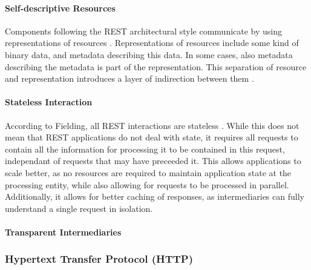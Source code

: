 \paragraph{Self-descriptive Resources}

Components following the \ac{REST} architectural style communicate by using representations of resources \cite{Fielding2000}.
Representations of resources include some kind of binary data, and metadata describing this data.
In some cases, also metadata describing the metadata is part of the representation.
This separation of resource and representation introduces a layer of indirection between them \cite{Erenkrantz2007}.

\paragraph{Stateless Interaction}

According to Fielding, all \ac{REST} interactions are stateless \cite{Fielding2000}.
While this does not mean that \ac{REST} applications do not deal with state, it requires all requests to contain all the information for processing it to be contained in this request, independant of requests that may have preceeded it.
This allows applications to scale better, as no resources are required to maintain application state at the processing entity, while also allowing for requests to be processed in parallel.
Additionally, it allows for better caching of responses, as intermediaries can fully understand a single request in isolation.

\paragraph{Transparent Intermediaries}

\subsubsection{Hypertext Transfer Protocol (\acs{HTTP})}


